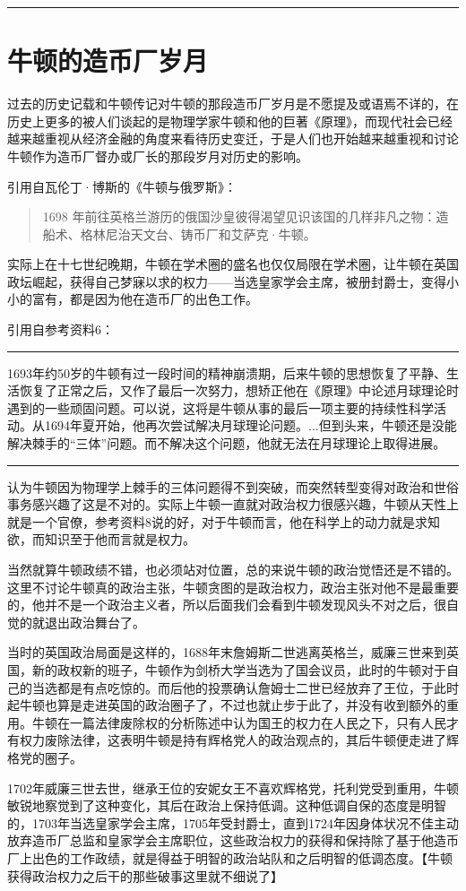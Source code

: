 \documentclass[12pt,oneside]{book}
\newcommand\hr{\par\noindent\hrule}
\begin{document}
\hr




\chapter{牛顿的造币厂岁月}
过去的历史记载和牛顿传记对牛顿的那段造币厂岁月是不愿提及或语焉不详的，在历史上更多的被人们谈起的是物理学家牛顿和他的巨著《原理》，而现代社会已经越来越重视从经济金融的角度来看待历史变迁，于是人们也开始越来越重视和讨论牛顿作为造币厂督办或厂长的那段岁月对历史的影响。

引用自瓦伦丁·博斯的《牛顿与俄罗斯》：
\begin{quotation}
1698 年前往英格兰游历的俄国沙皇彼得渴望见识该国的几样非凡之物：造船术、格林尼治天文台、铸币厂和艾萨克·牛顿。
\end{quotation}

实际上在十七世纪晚期，牛顿在学术圈的盛名也仅仅局限在学术圈，让牛顿在英国政坛崛起，获得自己梦寐以求的权力——当选皇家学会主席，被册封爵士，变得小小的富有，都是因为他在造币厂的出色工作。

引用自参考资料6：
\hr
1693年约50岁的牛顿有过一段时间的精神崩溃期，后来牛顿的思想恢复了平静、生活恢复了正常之后，又作了最后一次努力，想矫正他在《原理》中论述月球理论时遇到的一些顽固问题。可以说，这将是牛顿从事的最后一项主要的持续性科学活动。从1694年夏开始，他再次尝试解决月球理论问题。...但到头来，牛顿还是没能解决棘手的“三体”问题。而不解决这个问题，他就无法在月球理论上取得进展。
\hr

认为牛顿因为物理学上棘手的三体问题得不到突破，而突然转型变得对政治和世俗事务感兴趣了这是不对的。实际上牛顿一直就对政治权力很感兴趣，牛顿从天性上就是一个官僚，参考资料8说的好，对于牛顿而言，他在科学上的动力就是求知欲，而知识至于他而言就是权力。

当然就算牛顿政绩不错，也必须站对位置，总的来说牛顿的政治觉悟还是不错的。这里不讨论牛顿真的政治主张，牛顿贪图的是政治权力，政治主张对他不是最重要的，他并不是一个政治主义者，所以后面我们会看到牛顿发现风头不对之后，很自觉的就退出政治舞台了。

当时的英国政治局面是这样的，1688年末詹姆斯二世逃离英格兰，威廉三世来到英国，新的政权新的班子，牛顿作为剑桥大学当选为了国会议员，此时的牛顿对于自己的当选都是有点吃惊的。而后他的投票确认詹姆士二世已经放弃了王位，于此时起牛顿也算是走进英国的政治圈子了，不过也就止步于此了，并没有收到额外的重用。牛顿在一篇法律废除权的分析陈述中认为国王的权力在人民之下，只有人民才有权力废除法律，这表明牛顿是持有辉格党人的政治观点的，其后牛顿便走进了辉格党的圈子。

1702年威廉三世去世，继承王位的安妮女王不喜欢辉格党，托利党受到重用，牛顿敏锐地察觉到了这种变化，其后在政治上保持低调。这种低调自保的态度是明智的，1703年当选皇家学会主席，1705年受封爵士，直到1724年因身体状况不佳主动放弃造币厂总监和皇家学会主席职位，这些政治权力的获得和保持除了基于他造币厂上出色的工作政绩，就是得益于明智的政治站队和之后明智的低调态度。【牛顿获得政治权力之后干的那些破事这里就不细说了】
\end{document}
